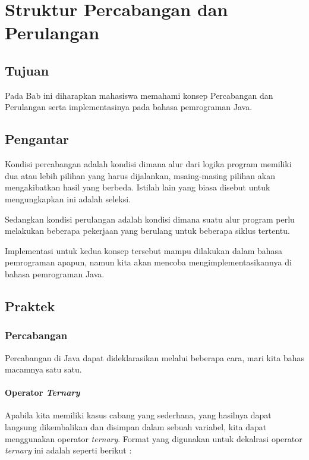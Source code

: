 \chapter{Struktur Percabangan dan Perulangan}

\section{Tujuan}

Pada Bab ini diharapkan mahasiswa memahami konsep Percabangan dan Perulangan serta implementasinya pada bahasa pemrograman Java.

\section{Pengantar}

Kondisi percabangan adalah kondisi dimana alur dari logika program memiliki dua atau lebih pilihan yang harus dijalankan, msaing-masing pilihan akan mengakibatkan hasil yang berbeda. Istilah lain yang biasa disebut untuk mengungkapkan ini adalah seleksi.

Sedangkan kondisi perulangan adalah kondisi dimana suatu alur program perlu melakukan beberapa pekerjaan yang berulang untuk beberapa siklus tertentu.

Implementasi untuk kedua konsep tersebut mampu dilakukan dalam bahasa pemrograman apapun, namun kita akan mencoba mengimplementasikannya di bahasa pemrograman Java.

\section{Praktek}

\subsection{Percabangan}

Percabangan di Java dapat dideklarasikan melalui beberapa cara, mari kita bahas macamnya satu satu.

\subsubsection{Operator \textit{Ternary}}

Apabila kita memiliki kasus cabang yang sederhana, yang hasilnya dapat langsung dikembalikan dan disimpan dalam sebuah variabel, kita dapat menggunakan operator \textit{ternary}. Format yang digunakan untuk dekalrasi operator \textit{ternary} ini adalah seperti berikut :

